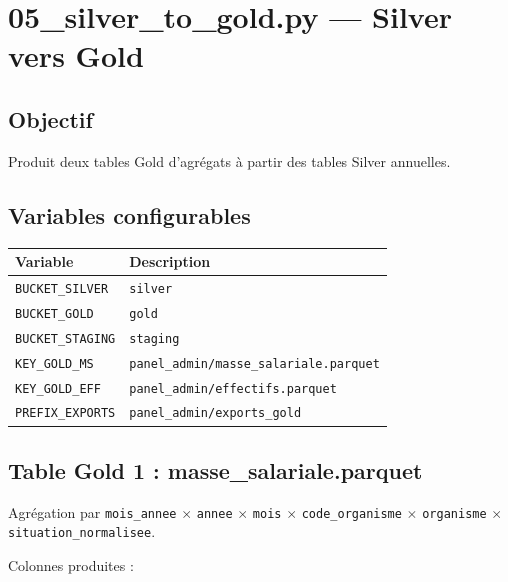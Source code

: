 \documentclass[12pt,a4paper,french]{report}
\begin{document}
\section{05\_silver\_to\_gold.py — Silver vers Gold}

\subsection{Objectif}

Produit deux tables Gold d'agrégats à partir des tables Silver annuelles.

\subsection{Variables configurables}

\begin{tabularx}{\textwidth}{lX}
  \toprule
  \textbf{Variable} & \textbf{Description} \\
  \midrule
  \texttt{BUCKET\_SILVER} & \texttt{silver} \\
  \texttt{BUCKET\_GOLD} & \texttt{gold} \\
  \texttt{BUCKET\_STAGING} & \texttt{staging} \\
  \texttt{KEY\_GOLD\_MS} &
    \texttt{panel\_admin/masse\_salariale.parquet} \\
  \texttt{KEY\_GOLD\_EFF} &
    \texttt{panel\_admin/effectifs.parquet} \\
  \texttt{PREFIX\_EXPORTS} &
    \texttt{panel\_admin/exports\_gold} \\
  \bottomrule
\end{tabularx}

\subsection{Table Gold 1 : masse\_salariale.parquet}

Agrégation par \texttt{mois\_annee} $\times$ \texttt{annee} $\times$
\texttt{mois} $\times$ \texttt{code\_organisme} $\times$
\texttt{organisme} $\times$ \texttt{situation\_normalisee}.

Colonnes produites :
\end{document}
